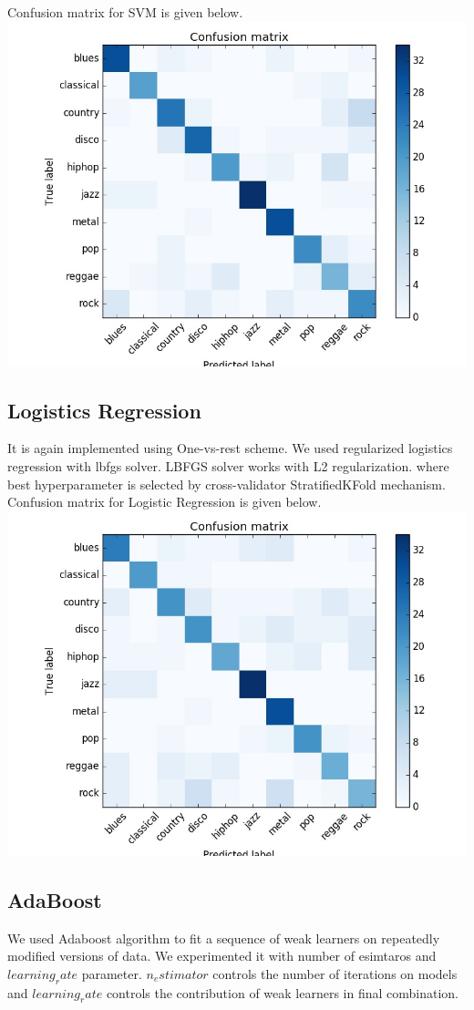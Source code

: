 \documentclass[conference]{IEEEtran}
\begin{document}
Confusion matrix for SVM is given below.
\includegraphics[width=\columnwidth]{SVM}
\subsection{Logistics Regression}
\label{sec:Logistics Regression}
It is again implemented using One-vs-rest scheme. We used regularized logistics regression with lbfgs solver. LBFGS solver works with L2 regularization. where best hyperparameter is selected by cross-validator StratifiedKFold mechanism.
Confusion matrix for Logistic Regression is given below.
\includegraphics[width=\columnwidth]{LOGISTIC}


\subsection{AdaBoost}
\label{sub:AdaBoost Classification}
We used Adaboost algorithm to fit a sequence of weak learners on repeatedly modified versions of data. We experimented it with number of esimtaros and $learning_rate$ parameter. $n_estimator$ controls the number of iterations on models and $learning_rate$ controls the contribution of weak learners in final combination.
\end{document}
